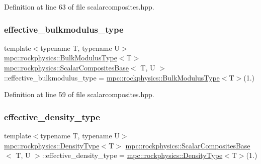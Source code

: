 Definition at line 63 of file scalarcomposites.\+hpp.

\mbox{\label{classmpc_1_1rockphysics_1_1_scalar_composites_base_a6ca760221b4aedaa09698317c7fddfb3}} 
\subsubsection{\texorpdfstring{effective\+\_\+bulkmodulus\+\_\+type}{effective\_bulkmodulus\_type}}
{\footnotesize\ttfamily template$<$typename T, typename U$>$ \\
\mbox{\hyperlink{structmpc_1_1rockphysics_1_1_bulk_modulus_type}{mpc\+::rockphysics\+::\+Bulk\+Modulus\+Type}}$<$T$>$ \mbox{\hyperlink{classmpc_1_1rockphysics_1_1_scalar_composites_base}{mpc\+::rockphysics\+::\+Scalar\+Composites\+Base}}$<$ T, U $>$\+::effective\+\_\+bulkmodulus\+\_\+type = \mbox{\hyperlink{structmpc_1_1rockphysics_1_1_bulk_modulus_type}{mpc\+::rockphysics\+::\+Bulk\+Modulus\+Type}}$<$T$>$(1.)\hspace{0.3cm}{\ttfamily [protected]}}



Definition at line 59 of file scalarcomposites.\+hpp.

\mbox{\label{classmpc_1_1rockphysics_1_1_scalar_composites_base_a0130d1233808c5fa98d90157274f671c}} 
\subsubsection{\texorpdfstring{effective\+\_\+density\+\_\+type}{effective\_density\_type}}
{\footnotesize\ttfamily template$<$typename T, typename U$>$ \\
\mbox{\hyperlink{structmpc_1_1rockphysics_1_1_density_type}{mpc\+::rockphysics\+::\+Density\+Type}}$<$T$>$ \mbox{\hyperlink{classmpc_1_1rockphysics_1_1_scalar_composites_base}{mpc\+::rockphysics\+::\+Scalar\+Composites\+Base}}$<$ T, U $>$\+::effective\+\_\+density\+\_\+type = \mbox{\hyperlink{structmpc_1_1rockphysics_1_1_density_type}{mpc\+::rockphysics\+::\+Density\+Type}}$<$T$>$(1.)\hspace{0.3cm}{\ttfamily [protected]}}



